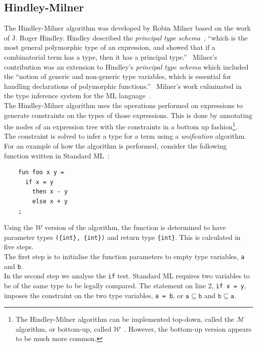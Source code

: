 \documentclass[12pt, titlepage]{article}
\begin{document}
\subsection{Hindley-Milner}
The Hindley-Milner algorithm was developed by Robin Milner based on the work of J. Roger Hindley. Hindley described the \textit{principal
type schema}~\cite{hindley69}, ``which is the most general polymorphic type of an expression, and showed that if a combinatorial term has a type, then it has a principal type.''~\cite{cardelli87} Milner's contribution was an extension to Hindley's \textit{principal type schema} which included the ``notion of generic and non-generic type variables, which is essential for handling declarations of polymorphic functions.''~\cite{cardelli87} Milner's work culminated in the type inference system for the ML language~\cite{milner84}. \\
\indent The Hindley-Milner algorithm uses the operations performed on expressions to generate constraints on the types of those expressions. This is done by annotating the nodes of an expression tree with the constraints in a bottom up fashion\footnote{The Hindley-Milner algorithm can be implemented top-down, called the $\mathcal{M}$ algorithm, or bottom-up, called $\mathcal{W}$~\cite{heeren02}. However, the bottom-up version appears to be much more common.}. \\ 
\indent The constraint is solved to infer a type for a term using a \textit{unification} algorithm. \\
\indent For an example of how the algorithm is performed, consider the following function written in Standard ML~\cite{cannonlocalizedtype}:
\begin{lstlisting}
    fun foo x y =
      if x = y
        then x - y
        else x + y
    ;
\end{lstlisting}
Using the $\mathcal{W}$ version of the algorithm, the function is determined to have parameter types \texttt{(\{int\}, \{int\})} and return type \texttt{\{int\}}. This is calculated in five steps. \\
\indent The first step is to initialise the function parameters to empty type variables, \texttt{a} and \texttt{b}. \\
\indent In the second step we analyse the \texttt{if} test. Standard ML requires two variables to be of the same type to be legally compared. The statement on line 2, \texttt{if x = y}, imposes the constraint on the two type variables, \texttt{a = b}, or $\mathtt{a \subseteq b}$ and $\mathtt{b \subseteq a}$. \\
\end{document}
